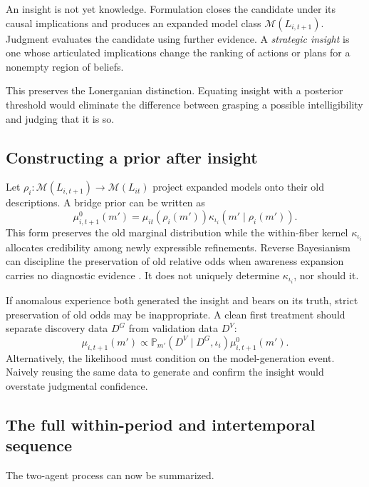 \documentclass[11pt]{article}
\newcommand{\M}{\mathcal{M}}
\newcommand{\Prb}{\mathbb{P}}
\begin{document}
	An insight is not yet knowledge.  Formulation closes the candidate under its causal implications and produces an expanded model class $\M(L_{i,t+1})$.  Judgment evaluates the candidate using further evidence.  A \emph{strategic insight} is one whose articulated implications change the ranking of actions or plans for a nonempty region of beliefs.
	
	This preserves the Lonerganian distinction.  Equating insight with a posterior threshold would eliminate the difference between grasping a possible intelligibility and judging that it is so.
	
	\subsection{Constructing a prior after insight}
	
	Let $\rho_i:\M(L_{i,t+1})\to\M(L_{it})$ project expanded models onto their old descriptions.  A bridge prior can be written as
	\begin{equation}
		\label{eq:bridge}
		\mu_{i,t+1}^{0}(m')
		=
		\mu_{it}\!\left(\rho_i(m')\right)
		\kappa_{\iota_i}\!\left(m'\mid\rho_i(m')\right).
	\end{equation}
	This form preserves the old marginal distribution while the within-fiber kernel $\kappa_{\iota_i}$ allocates credibility among newly expressible refinements.  Reverse Bayesianism can discipline the preservation of old relative odds when awareness expansion carries no diagnostic evidence \citep{KarniViero2013}.  It does not uniquely determine $\kappa_{\iota_i}$, nor should it.
	
	If anomalous experience both generated the insight and bears on its truth, strict preservation of old odds may be inappropriate.  A clean first treatment should separate discovery data $D^G$ from validation data $D^V$:
	\begin{equation}
		\mu_{i,t+1}(m')
		\propto
		\Prb_{m'}(D^V\mid D^G,\iota_i)
		\mu_{i,t+1}^{0}(m').
	\end{equation}
	Alternatively, the likelihood must condition on the model-generation event.  Naively reusing the same data to generate and confirm the insight would overstate judgmental confidence.
	
	\subsection{The full within-period and intertemporal sequence}
	
	The two-agent process can now be summarized.
	
\end{document}
